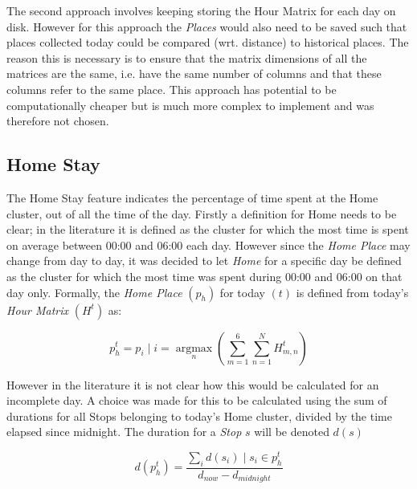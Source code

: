 The second approach involves keeping storing the Hour Matrix for each day  on disk. However for this approach the \textit{Places} would also need to be saved such that places collected today could be compared (wrt. distance) to historical places. The reason this is necessary is to ensure that the matrix dimensions of all the matrices are the same, i.e. have the same number of columns and that these columns refer to the same place. This approach has potential to be computationally cheaper but is much more complex to implement and was therefore not chosen.

\subsection{Home Stay}
The Home Stay feature indicates the percentage of time spent at the Home cluster, out of all the time of the day. Firstly a definition for Home needs to be clear; in the literature it is defined as the cluster for which the most time is spent on average between 00:00 and 06:00 each day. However since the \textit{Home Place} may change from day to day, it was decided to let \textit{Home} for a specific day be defined as the cluster for which the most time was spent during 00:00 and 06:00 on that day only. Formally, the \textit{Home Place} $(p_h)$ for today $(t)$ is defined from today's \textit{Hour Matrix } $(H^t)$ as:

$$p_{h}^{t} = p_i \;|\; i = \operatorname*{argmax}_n(\sum_{m=1}^{6} \sum_{n=1}^{N} H^{t}_{m,n})$$

However in the literature \cite{Saeb2015, Canzian2015} it is not clear how this would be calculated for an incomplete day. A choice was made for this to be calculated using the sum of durations for all Stops belonging to today's Home cluster, divided by the time elapsed since midnight. The duration for a \textit{Stop} $s$ will be denoted $d(s)$

$$d(p_{h}^{t}) = \frac{\sum_i d(s_i) \;|\; s_i \in p_{h}^{t}}{d_{now} - d_{midnight}}$$
